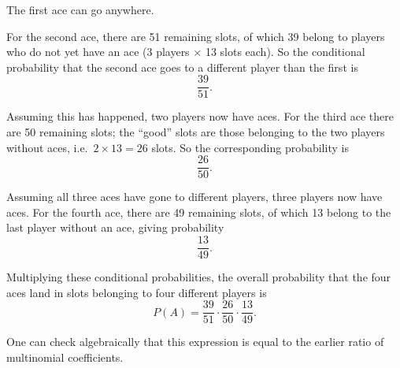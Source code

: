 The first ace can go anywhere.  

For the second ace, there are 51 remaining slots, of which 39 belong to players who do not yet have an ace (3 players \(\times\) 13 slots each).  
So the conditional probability that the second ace goes to a different player than the first is
\[
\frac{39}{51}.
\]

Assuming this has happened, two players now have aces.  
For the third ace there are 50 remaining slots; the “good” slots are those belonging to the two players without aces, i.e.\ \(2 \times 13 = 26\) slots.  
So the corresponding probability is
\[
\frac{26}{50}.
\]

Assuming all three aces have gone to different players, three players now have aces.  
For the fourth ace, there are 49 remaining slots, of which 13 belong to the last player without an ace, giving probability
\[
\frac{13}{49}.
\]

Multiplying these conditional probabilities, the overall probability that the four aces land in slots belonging to four different players is
\[
P(A)
= \frac{39}{51} \cdot \frac{26}{50} \cdot \frac{13}{49}.
\]

One can check algebraically that this expression is equal to the earlier ratio of multinomial coefficients.
